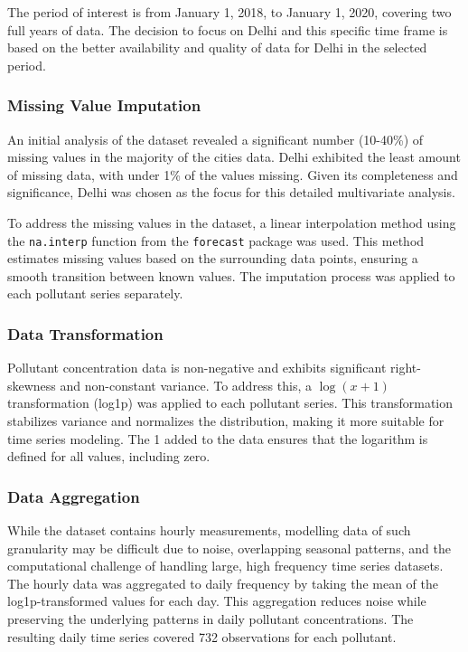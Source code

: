 \documentclass[fleqn,10pt]{SelfArx} %
\begin{document}
The period of interest is from January 1, 2018, to January 1, 2020, covering two full years of data. The decision to focus on Delhi and this specific time frame is based on the better availability and quality of data for Delhi in the selected period.

\subsubsection{Missing Value Imputation}
An initial analysis of the dataset revealed a significant number (10-40\%) of missing values in the majority of the cities data. Delhi exhibited the least amount of missing data, with under 1\% of the values missing. Given its completeness and significance, Delhi was chosen as the focus for this detailed multivariate analysis.

To address the missing values in the dataset, a linear interpolation method using the \texttt{na.interp} function from the \texttt{forecast} package was used. This method estimates missing values based on the surrounding data points, ensuring a smooth transition between known values. The imputation process was applied to each pollutant series separately.

\subsubsection{Data Transformation}
Pollutant concentration data is non-negative and exhibits significant right-skewness and non-constant variance. To address this, a $\log(x+1)$ transformation (log1p) was applied to each pollutant series. This transformation stabilizes variance and normalizes the distribution, making it more suitable for time series modeling. The 1 added to the data ensures that the logarithm is defined for all values, including zero.

\subsubsection{Data Aggregation}
While the dataset contains hourly measurements, modelling data of such granularity may be difficult due to noise, overlapping seasonal patterns, and the computational challenge of handling large, high frequency time series datasets. The hourly data was aggregated to daily frequency by taking the mean of the log1p-transformed values for each day. This aggregation reduces noise while preserving the underlying patterns in daily pollutant concentrations. The resulting daily time series covered 732 observations for each pollutant.
\end{document}
